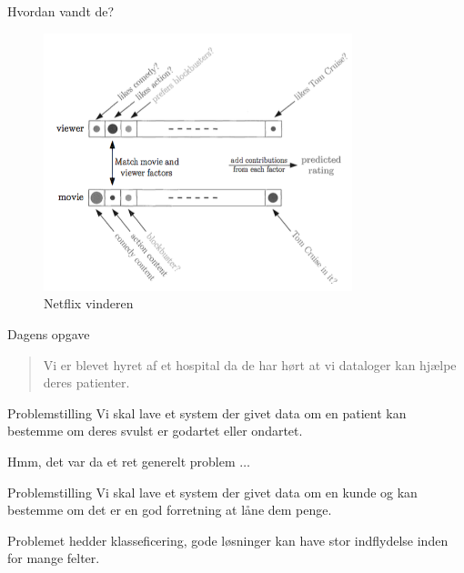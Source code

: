 \documentclass[12pt,t]{beamer}
\begin{document}
    \begin{frame}{Hvordan vandt de?}
        \begin{figure}[h!]
            \caption{Netflix vinderen}
            \centering
            \includegraphics[width=0.8\textwidth]{include/netflix.png}
        \end{figure}
    \end{frame}

    \begin{frame}[t]{Dagens opgave}
        \begin{quote}
            Vi er blevet hyret af et hospital da de har hørt at vi dataloger
            kan hjælpe deres patienter.
        \end{quote}
        \pause
        \begin{block}{Problemstilling}
            Vi skal lave et system der givet data om en patient kan bestemme
            om deres svulst er godartet eller ondartet.
        \end{block}
        \pause
        \centering Hmm, det var da et ret generelt problem $\dots$
        \pause
        \begin{block}{Problemstilling}
            Vi skal lave et system der givet data om en \alert{kunde} og
            kan bestemme om det er en god forretning at låne dem penge.
        \end{block}
        \pause
        \centering Problemet hedder klasseficering, gode løsninger kan have stor
        indflydelse inden for mange felter.
    \end{frame}
\end{document}
